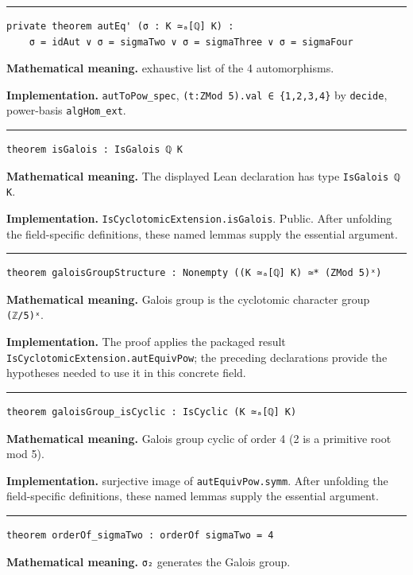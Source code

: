 \documentclass[UTF8,a4paper,11pt,fontset=fandol]{ctexart}
\theoremstyle{definition}
\newcommand{\statementsep}{\par\medskip\hrule\medskip}
\begin{document}
\statementsep
\begin{verbatim}
private theorem autEq' (σ : K ≃ₐ[ℚ] K) :
    σ = idAut ∨ σ = sigmaTwo ∨ σ = sigmaThree ∨ σ = sigmaFour
\end{verbatim}
\noindent\textbf{Mathematical meaning.} exhaustive list of the 4 automorphisms.\par
\noindent\textbf{Implementation.} \texttt{autToPow\_\allowbreak{}spec}, \texttt{(t:ZMod 5).\allowbreak{}val ∈ \{1,2,3,4\}} by \texttt{decide}, power-basis \texttt{algHom\_\allowbreak{}ext}.\par
\statementsep
\begin{verbatim}
theorem isGalois : IsGalois ℚ K
\end{verbatim}
\noindent\textbf{Mathematical meaning.} The displayed Lean declaration has type \texttt{IsGalois ℚ K}.\par
\noindent\textbf{Implementation.} \texttt{IsCyclotomicExtension.\allowbreak{}isGalois}. Public. After unfolding the field-specific definitions, these named lemmas supply the essential argument.\par
\statementsep
\begin{verbatim}
theorem galoisGroupStructure : Nonempty ((K ≃ₐ[ℚ] K) ≃* (ZMod 5)ˣ)
\end{verbatim}
\noindent\textbf{Mathematical meaning.} Galois group is the cyclotomic character group \texttt{(ℤ/\allowbreak{}5)ˣ}.\par
\noindent\textbf{Implementation.} The proof applies the packaged result \texttt{IsCyclotomicExtension.\allowbreak{}autEquivPow}; the preceding declarations provide the hypotheses needed to use it in this concrete field.\par
\statementsep
\begin{verbatim}
theorem galoisGroup_isCyclic : IsCyclic (K ≃ₐ[ℚ] K)
\end{verbatim}
\noindent\textbf{Mathematical meaning.} Galois group cyclic of order 4 (2 is a primitive root mod 5).\par
\noindent\textbf{Implementation.} surjective image of \texttt{autEquivPow.\allowbreak{}symm}. After unfolding the field-specific definitions, these named lemmas supply the essential argument.\par
\statementsep
\begin{verbatim}
theorem orderOf_sigmaTwo : orderOf sigmaTwo = 4
\end{verbatim}
\noindent\textbf{Mathematical meaning.} \texttt{σ₂} generates the Galois group.\par
\end{document}
